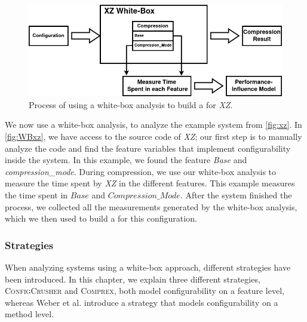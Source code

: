 \begin{figure}[h]
    \centering
    \includegraphics[scale=0.55]{gfx/whitebox_2.png}
    \caption{Process of using a white-box analysis to build a {\perfInfluenceModel} for \textit{XZ}.}
    \label{fig:WBxz}
\end{figure}

We now use a white-box analysis, to analyze the example system from \autoref{fig:xz}. 
In \autoref{fig:WBxz}, we have access to the source code of \textit{XZ}; 
our first step is to manually analyze the code and find the feature variables that implement configurability inside the system. 
In this example, we found the feature \textit{Base} and \textit{compression\_mode}. 
During compression, we use our white-box analysis to measure the time spent by \textit{XZ} in the different features. 
This example measures the time spent in $Base$ and $Compression\_Mode$. 
After the system finished the process, we collected all the measurements generated by the white-box analysis, 
which we then used to build a {\perfInfluenceModel} for this configuration.

\subsubsection{Strategies}\label{analyzing-strats}
When analyzing systems using a white-box approach, different strategies have been introduced. 
In this chapter, we explain three different strategies, \textsc{ConfigCrusher} and \textsc{Comprex}, 
both model configurability on a feature level, whereas Weber et al. introduce a strategy that models configurability on a method level.

